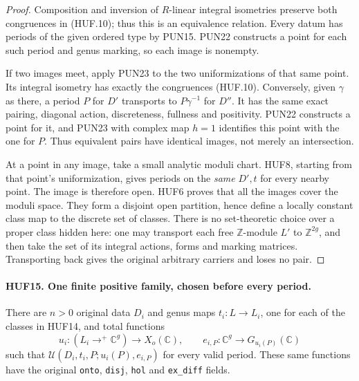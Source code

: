 \begin{proof}
Composition and inversion of \(R\)-linear integral
isometries preserve both congruences in (HUF.10);
thus this is an equivalence relation.
Every datum has periods of the given ordered type
by PUN15.  PUN22 constructs a point for each such
period and genus marking, so each image is nonempty.

If two images meet, apply PUN23 to the two
uniformizations of that same point.  Its integral
isometry has exactly the congruences (HUF.10).
Conversely, given \(\gamma\) as there, a period
\(P\) for \(D'\) transports to \(P\gamma^{-1}\)
for \(D''\).  It has the same exact pairing,
diagonal action, discreteness, fullness and positivity.
PUN22 constructs a point for it, and PUN23 with
complex map \(h=1\) identifies this point with the
one for \(P\).  Thus equivalent pairs have identical
images, not merely an intersection.

At a point in any image, take a small analytic
moduli chart.  HUF8, starting from that point's
uniformization, gives periods on the \emph{same}
\(D',t\) for every nearby point.  The image is
therefore open.  HUF6 proves that all the images
cover the moduli space.  They form a disjoint open
partition, hence define a locally constant class
map to the discrete set of classes.
There is no set-theoretic choice over a proper
class hidden here: one may transport each free
\(\mathbb Z\)-module \(L'\) to
\(\mathbb Z^{2g}\), and then take the set of
its integral actions, forms and marking matrices.
Transporting back gives the original arbitrary
carriers and loses no pair.
\end{proof}

\paragraph{HUF15. One finite positive family, chosen before every period.}
\label{claim:HUF15}
There are \(n>0\) original data \(D_i\) and genus
maps \(t_i:L\to L_i\), one for each of the classes
in HUF14, and total functions
\[
 u_i:(L_i\to^+\mathbb C^g)\to X_o(\mathbb C),\qquad
 e_{i,P}:\mathbb C^g\to G_{u_i(P)}(\mathbb C)
 \tag{HUF.11}
\]
such that \(\mathcal U(D_i,t_i,P;u_i(P),e_{i,P})\)
for every valid period.  These same functions have
the original \texttt{onto}, \texttt{disj},
\texttt{hol} and \texttt{ex\_diff} fields.

